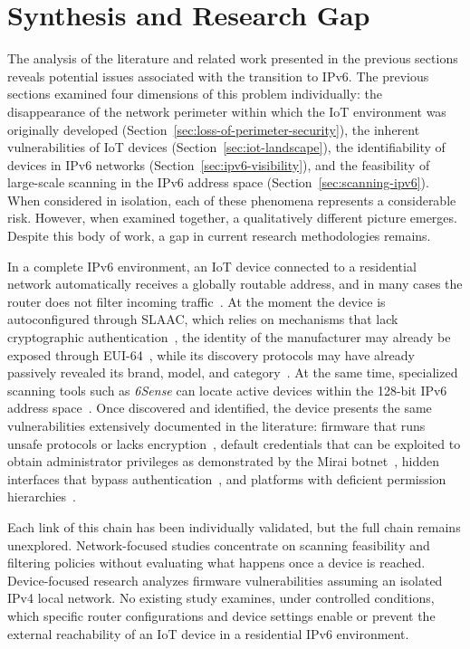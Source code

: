 \section{Synthesis and Research Gap}\label{sec:synthesis-gap}
The analysis of the literature and related work presented in the previous sections reveals potential issues associated with the transition to IPv6. The previous sections examined four dimensions of this problem individually: the disappearance of the network perimeter within which the IoT environment was originally developed (Section~\ref{sec:loss-of-perimeter-security}), the inherent vulnerabilities of IoT devices (Section~\ref{sec:iot-landscape}), the identifiability of devices in IPv6 networks (Section~\ref{sec:ipv6-visibility}), and the feasibility of large-scale scanning in the IPv6 address space (Section~\ref{sec:scanning-ipv6}). When considered in isolation, each of these phenomena represents a considerable risk. However, when examined together, a qualitatively different picture emerges. Despite this body of work, a gap in current research methodologies remains.

In a complete IPv6 environment, an IoT device connected to a residential network automatically receives a globally routable address, and in many cases the router does not filter incoming traffic~\cite{rye2025firewalls, rfc4890}. At the moment the device is autoconfigured through SLAAC, which relies on mechanisms that lack cryptographic authentication~\cite{rfc3756}, the identity of the manufacturer may already be exposed through EUI-64~\cite{rye2023ipvseeyou}, while its discovery protocols may have already passively revealed its brand, model, and category~\cite{yu2020broadcast}. At the same time, specialized scanning tools such as \textit{6Sense} can locate active devices within the 128-bit IPv6 address space~\cite{williams20246sense}. Once discovered and identified, the device presents the same vulnerabilities extensively documented in the literature: firmware that runs unsafe protocols or lacks encryption~\cite{alrawi2019sok}, default credentials that can be exploited to obtain administrator privileges as demonstrated by the Mirai botnet~\cite{antonakakis2017mirai}, hidden interfaces that bypass authentication~\cite{liu2025eagleye}, and platforms with deficient permission hierarchies~\cite{fernandes2016smarthome}.

Each link of this chain has been individually validated, but the full chain remains unexplored. Network-focused studies concentrate on scanning feasibility and filtering policies without evaluating what happens once a device is reached. Device-focused research analyzes firmware vulnerabilities assuming an isolated IPv4 local network. No existing study examines, under controlled conditions, which specific router configurations and device settings enable or prevent the external reachability of an IoT device in a residential IPv6 environment.

